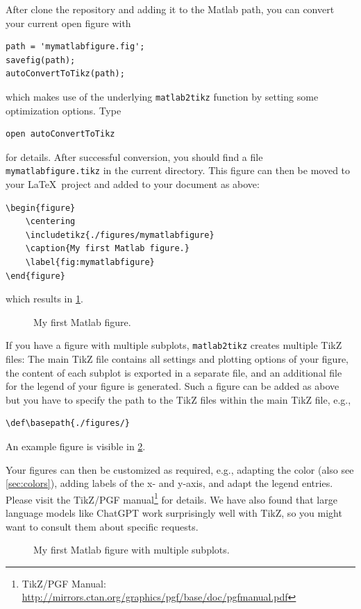 \documentclass{article}
\begin{document}
After clone the repository and adding it to the Matlab path,
you can convert your current open figure with
\begin{verbatim}
path = 'mymatlabfigure.fig';
savefig(path);
autoConvertToTikz(path);
\end{verbatim}
which makes use of the underlying \texttt{matlab2tikz} function by setting some optimization options. Type
\begin{verbatim}
open autoConvertToTikz
\end{verbatim}
for details.
After successful conversion, you should find a file \texttt{mymatlabfigure.tikz} in the current directory.
This figure can then be moved to your \LaTeX\ project and added to your document as above:
\begin{verbatim}
\begin{figure}
    \centering
    \includetikz{./figures/mymatlabfigure}
    \caption{My first Matlab figure.}
    \label{fig:mymatlabfigure}
\end{figure}
\end{verbatim}
which results in \cref{fig:mymatlabfigure}.
\begin{figure}[h!]
  \centering
  \caption{My first Matlab figure.}
  \label{fig:mymatlabfigure}
\end{figure}

If you have a figure with multiple subplots, \texttt{matlab2tikz} creates multiple TikZ files:
The main TikZ file contains all settings and plotting options of your figure,
the content of each subplot is exported in a separate file,
and an additional file for the legend of your figure is generated.
Such a figure can be added as above but you have to specify the path to the TikZ files within the main TikZ file, e.g.,
\begin{verbatim}
\def\basepath{./figures/}
\end{verbatim}
An example figure is visible in \cref{fig:mymatlabgroupfigure}.

Your figures can then be customized as required, e.g., adapting the color (also see \cref{sec:colors}), adding labels of the x- and y-axis, and adapt the legend entries.
Please visit the TikZ/PGF manual\footnote{TikZ/PGF Manual: \url{http://mirrors.ctan.org/graphics/pgf/base/doc/pgfmanual.pdf}} for details.
We have also found that large language models like ChatGPT work surprisingly well with TikZ,
so you might want to consult them about specific requests.

\begin{figure}[h!]
  \centering
  \caption{My first Matlab figure with multiple subplots.}
  \label{fig:mymatlabgroupfigure}
\end{figure}
\end{document}
